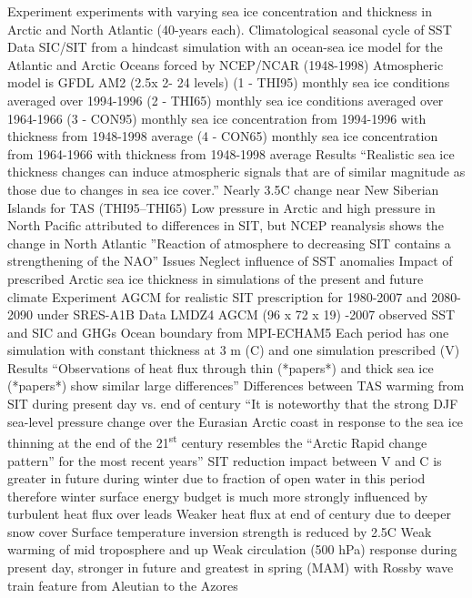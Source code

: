 \documentclass[12pt,fleqn]{article}
\begin{document}
\begin{outline}[enumerate]
	\2 Experiment
		 experiments with varying sea ice concentration and thickness in Arctic and North Atlantic (40-years each). Climatological seasonal cycle of SST
	\2 Data
		\3 SIC/SIT from a hindcast simulation with an ocean-sea ice model for the Atlantic and Arctic Oceans forced by NCEP/NCAR (1948-1998)
		\3 Atmospheric model is GFDL AM2 (2.5\degree x 2\degree - 24 levels)
		\3 (1 - THI95) monthly sea ice conditions averaged over 1994-1996
		\3 (2 - THI65) monthly sea ice conditions averaged over 1964-1966
		\3 (3 - CON95) monthly sea ice concentration from 1994-1996 with thickness from 1948-1998 average
		\3 (4 - CON65) monthly sea ice concentration from 1964-1966 with thickness from 1948-1998 average
	\2 Results
		\3 ``Realistic sea ice thickness changes can induce atmospheric signals that are of similar magnitude as those due to changes in sea ice cover.''
		\3 Nearly 3.5\degree C change near New Siberian Islands for TAS (THI95--THI65)
		\3 Low pressure in Arctic and high pressure in North Pacific attributed to differences in SIT, but NCEP reanalysis shows the change in North Atlantic
		\3 ''Reaction of atmosphere to decreasing SIT contains a strengthening of the NAO''
	\2 Issues
		\3 Neglect influence of SST anomalies
\1 Impact of prescribed Arctic sea ice thickness in simulations of the present and future climate \citep{Krinner2009}
	\2 Experiment
		\3 AGCM for realistic SIT prescription for 1980-2007 and 2080-2090 under SRES-A1B
	\2 Data
		\3 LMDZ4 AGCM (96 x 72 x 19)
		-2007 observed SST and SIC and GHGs
		\3 Ocean boundary from MPI-ECHAM5
		\3 Each period has one simulation with constant thickness at 3 m (C) and one simulation prescribed (V)
	\2 Results
		\3 ``Observations of heat flux through thin (*papers*) and thick sea ice (*papers*) show similar large differences''
		\3 Differences between TAS warming from SIT during present day vs. end of century
		\3 ``It is noteworthy that the strong DJF sea-level pressure change over the Eurasian Arctic coast in response to the sea ice thinning at the end of the 21\textsuperscript{st} century resembles the ``Arctic Rapid change pattern'' for the most recent years''
		\3 SIT reduction impact between V and C is greater in future during winter due to fraction of open water in this period therefore winter surface energy budget is much more strongly influenced by turbulent heat flux over leads
		\3 Weaker heat flux at end of century due to deeper snow cover
		\3 Surface temperature inversion strength is reduced by 2.5\degree C
		\3 Weak warming of mid troposphere and up
		\3 Weak circulation (500 hPa) response during present day, stronger in future and greatest in spring  (MAM) with Rossby wave train feature from Aleutian to the Azores

\end{outline}
\end{document}
